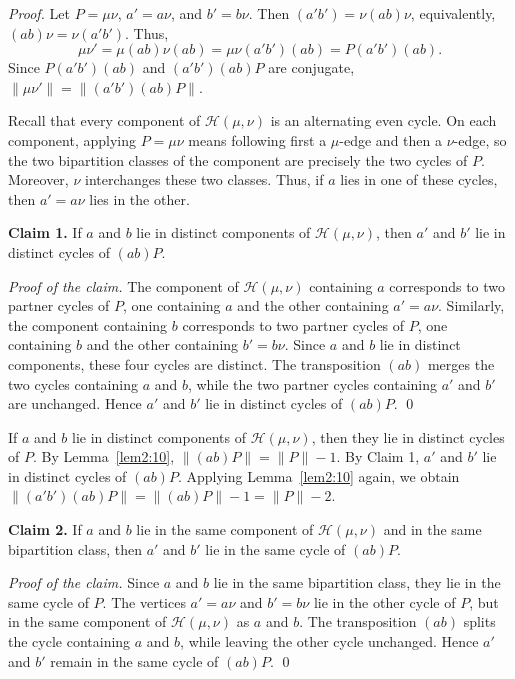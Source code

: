 \documentclass[12pt]{article}
\theoremstyle{definition}
\begin{document}
\begin{proof}
Let $P=\mu\nu$, $a'=a\nu$, and $b'=b\nu$.  Then
$(a'b')=\nu(ab)\nu$, equivalently, $(ab)\nu=\nu (a'b')$. Thus,
$$\mu\nu'=\mu(ab)\nu(ab)=\mu\nu (a'b')(ab)=P(a'b')(ab).$$
Since $P(a'b')(ab)$ and $(a'b')(ab)P$ are conjugate,
$\lVert\mu\nu'\rVert=\lVert (a'b')(ab)P\rVert$.

Recall that every component of $\mathcal H(\mu,\nu)$ is an alternating even cycle.
On each component, applying $P=\mu\nu$ means following first a $\mu$-edge and then a $\nu$-edge, so the two
bipartition classes of the component are precisely the two cycles of
$P$. Moreover, $\nu$ interchanges these two classes. Thus, if $a$ lies
in one of these cycles, then $a'=a\nu$ lies in the other.

\medskip
\noindent\textbf{Claim 1.}
If $a$ and $b$ lie in distinct components of
$\mathcal H(\mu,\nu)$, then $a'$ and $b'$ lie in distinct cycles of
$(ab)P$.
\smallskip

\noindent\emph{Proof of the claim.}
The component of $\mathcal H(\mu,\nu)$ containing $a$ corresponds to
two partner cycles of $P$, one containing $a$ and the other containing
$a'=a\nu$. Similarly, the component containing $b$ corresponds to two
partner cycles of $P$, one containing $b$ and the other containing
$b'=b\nu$. Since $a$ and $b$ lie in distinct components, these four cycles are distinct. The transposition $(ab)$ merges the two
cycles containing $a$ and $b$, while the two partner cycles containing
$a'$ and $b'$ are unchanged. Hence $a'$ and $b'$ lie in distinct cycles of $(ab)P$. \qed


If $a$ and $b$ lie in distinct components of
$\mathcal H(\mu,\nu)$, then they lie in distinct cycles of $P$. By
Lemma~\ref{lem2:10},
$\lVert(ab)P\rVert=\lVert P\rVert-1$.
By Claim 1, $a'$ and $b'$ lie in distinct cycles of $(ab)P$. Applying
Lemma~\ref{lem2:10} again, we obtain
$\lVert (a'b')(ab)P\rVert=\lVert(ab)P\rVert-1=\lVert P\rVert-2$.

\medskip
\noindent\textbf{Claim 2.}
If $a$ and $b$ lie in the same component of $\mathcal H(\mu,\nu)$ and in the same bipartition class, then $a'$ and $b'$ lie in the same cycle of $(ab)P$.

\smallskip
\noindent\emph{Proof of the claim.}
Since $a$ and $b$ lie in the same bipartition class, they lie in the same cycle of $P$. The vertices $a'=a\nu$ and $b'=b\nu$ lie in the other cycle of $P$, but in the same component of $\mathcal H(\mu,\nu)$ as $a$ and $b$. The transposition $(ab)$ splits the cycle containing $a$ and $b$, while leaving the other cycle unchanged. Hence $a'$ and $b'$ remain in the same cycle of $(ab)P$. \qed


\end{proof}
\end{document}
